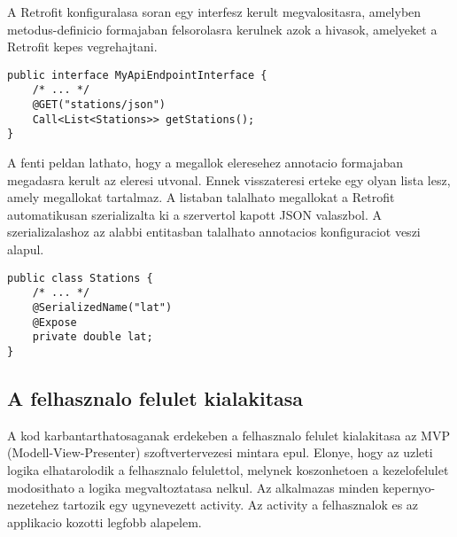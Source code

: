A Retrofit konfiguralasa soran egy interfesz kerult megvalositasra, amelyben metodus-definicio formajaban felsorolasra kerulnek azok a hivasok, amelyeket a Retrofit kepes vegrehajtani.
\begin{lstlisting}
public interface MyApiEndpointInterface {
	/* ... */
	@GET("stations/json")
    Call<List<Stations>> getStations();
}
\end{lstlisting}
A fenti peldan lathato, hogy a megallok eleresehez annotacio formajaban megadasra kerult az eleresi utvonal.
Ennek visszateresi erteke egy olyan lista lesz, amely megallokat tartalmaz.
A listaban talalhato megallokat a Retrofit automatikusan szerializalta ki a szervertol kapott JSON valaszbol.
A szerializalashoz az alabbi entitasban talalhato annotacios konfiguraciot veszi alapul.
\begin{lstlisting}
public class Stations {
	/* ... */
	@SerializedName("lat")
	@Expose
	private double lat;
}
\end{lstlisting}

\subsection*{A felhasznalo felulet kialakitasa}
\label{layout}
A kod karbantarthatosaganak erdekeben a felhasznalo felulet kialakitasa az MVP (Modell-View-Presenter) szoftvertervezesi mintara epul.
Elonye, hogy az uzleti logika elhatarolodik a felhasznalo felulettol, melynek koszonhetoen a kezelofelulet modosithato a logika megvaltoztatasa nelkul.
Az alkalmazas minden kepernyo-nezetehez tartozik egy ugynevezett activity.
Az activity a felhasznalok es az applikacio kozotti legfobb alapelem.
































\newpage
